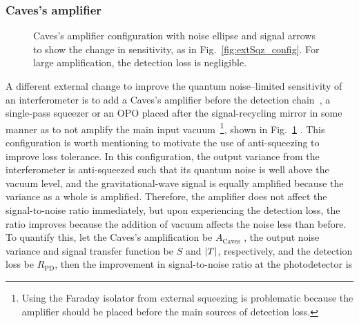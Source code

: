 \subsubsection{Caves's amplifier}

\begin{figure}
	\centering
	\caption{Caves's amplifier configuration with noise ellipse and signal arrows to show the change in sensitivity, as in Fig.~\ref{fig:extSqz_config}. For large amplification, the detection loss is negligible.}
	\label{fig:Cavess_amplifier}
\end{figure}

A different external change to improve the quantum noise--limited sensitivity of an interferometer is to add a Caves's amplifier before the detection chain~\cite{}, a single-pass squeezer or an OPO  placed after the signal-recycling mirror in some manner as to not amplify the main input vacuum~\footnote{Using the Faraday isolator from external squeezing is problematic because the amplifier should be placed before the main sources of detection loss.}, shown in Fig.~\ref{fig:Cavess_amplifier} . This configuration is worth mentioning %
to motivate the use of anti-squeezing to improve loss tolerance. 
In this configuration, the output variance from the interferometer is anti-squeezed such that its quantum noise is well above  the vacuum level, and the gravitational-wave signal is equally amplified because the variance as a whole is amplified. %
Therefore, the amplifier does not affect the signal-to-noise ratio immediately, but upon experiencing the detection loss, the ratio improves because the addition of vacuum affects the noise less than before. 
To quantify this, let the Caves's amplification be $A_\text{Caves}$ , the output noise variance and signal transfer function be $S$ and $\abs{T}$, respectively, and the detection loss be $R_\text{PD}$, then the improvement in signal-to-noise ratio at the photodetector is

